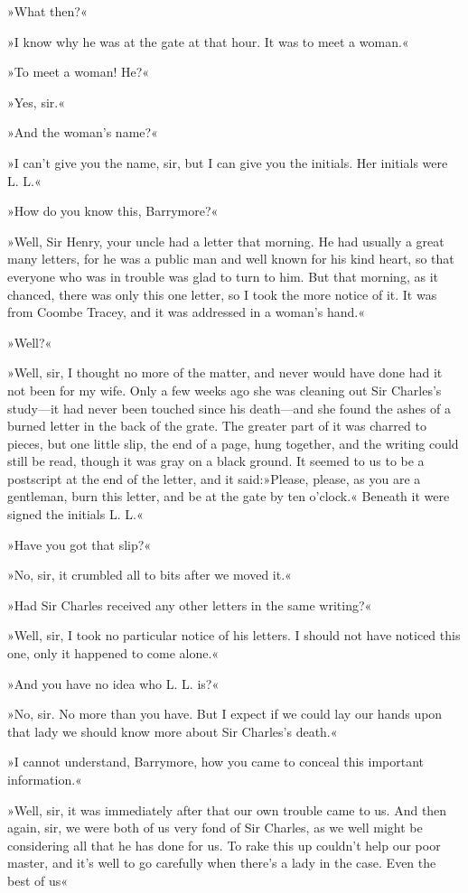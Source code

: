 »What then?«

»I know why he was at the gate at that hour. It was to meet a woman.«

»To meet a woman! He?«

»Yes, sir.«

»And the woman's name?«

»I can't give you the name, sir, but I can give you the initials. Her initials were L. L.«

»How do you know this, Barrymore?«

»Well, Sir Henry, your uncle had a letter that morning. He had usually a great many letters, for he was a public man and well known for his kind heart, so that everyone who was in trouble was glad to turn to him. But that morning, as it chanced, there was only this one letter, so I took the more notice of it. It was from Coombe Tracey, and it was addressed in a woman's hand.«

»Well?«


»Well, sir, I thought no more of the matter, and never would have done had it not been for my wife. Only a few weeks ago she was cleaning out Sir Charles's study—it had never been touched since his death—and she found the ashes of a burned letter in the back of the grate. The greater part of it was charred to pieces, but one little slip, the end of a page, hung together, and the writing could still be read, though it was gray on a black ground. It seemed to us to be a postscript at the end of the letter, and it said:»Please, please, as you are a gentleman, burn this letter, and be at the gate by ten o'clock.« Beneath it were signed the initials L. L.«

»Have you got that slip?«

»No, sir, it crumbled all to bits after we moved it.«

»Had Sir Charles received any other letters in the same writing?«

»Well, sir, I took no particular notice of his letters. I should not have noticed this one, only it happened to come alone.«

»And you have no idea who L. L. is?«

»No, sir. No more than you have. But I expect if we could lay our hands upon that lady we should know more about Sir Charles's death.«

»I cannot understand, Barrymore, how you came to conceal this important information.«

»Well, sir, it was immediately after that our own trouble came to us. And then again, sir, we were both of us very fond of Sir Charles, as we well might be considering all that he has done for us. To rake this up couldn't help our poor master, and it's well to go carefully when there's a lady in the case. Even the best of us\longdash«

